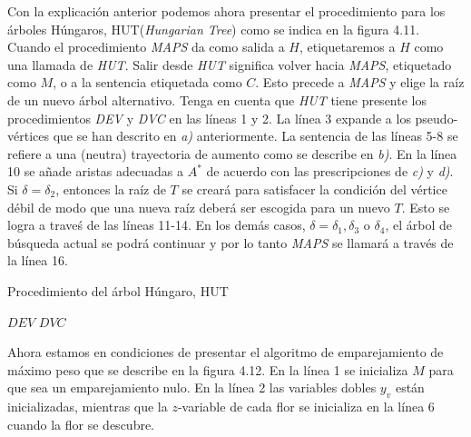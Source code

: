 \documentclass[10pt,a5paper]{book}
\begin{document}
Con la explicación anterior podemos ahora presentar el procedimiento para los árboles Húngaros, HUT(\emph{Hungarian Tree}) como se indica en la figura 4.11. Cuando el procedimiento \emph{MAPS} da como salida a $H$, etiquetaremos a $H$ como una llamada de \emph{HUT}. Salir desde \emph{HUT} significa volver hacia \emph{MAPS}, etiquetado como $M$, o a la sentencia etiquetada como $C$. Esto precede a \emph{MAPS} y elige la raíz de un nuevo árbol alternativo. Tenga en cuenta que \emph{HUT} tiene presente los procedimientos \emph{DEV} y \emph{DVC} en las líneas 1 y 2. La línea 3 expande a los pseudo-vértices que se han descrito en \emph{a)} anteriormente. La sentencia de las líneas 5-8 se refiere a una (neutra) trayectoria de aumento como se describe en \emph{b)}. En la línea 10 se añade aristas adecuadas a $A^*$ de acuerdo con las prescripciones de \emph{c)} y \emph{d)}. Si $\delta = \delta_2$, entonces la raíz de $T$ se creará para satisfacer la condición del vértice débil de modo que una nueva raíz deberá ser escogida para un nuevo $T$. Esto se logra a traveś de las líneas 11-14. En los demás casos, $\delta = \delta_1, \delta_3$ o $\delta_4$, el árbol de búsqueda actual se podrá continuar y por lo tanto \emph{MAPS} se llamará a través de la línea 16.

\vfill
\pagebreak
\begin{algorithm}[H]
\caption{Procedimiento del árbol Húngaro, HUT}
\BlankLine
\dontprintsemicolon
$DEV$\;
$DVC$\;
\;
{
}
\;
\end{algorithm}

Ahora estamos en condiciones de presentar el algoritmo de emparejamiento de máximo peso que se describe en la figura 4.12. En la línea 1 se inicializa $M$ para que sea un emparejamiento nulo. En la línea 2 las variables dobles $y_v$ están inicializadas, mientras que la $z$-variable de cada flor se inicializa en la línea 6 cuando la flor se descubre.
\end{document}
